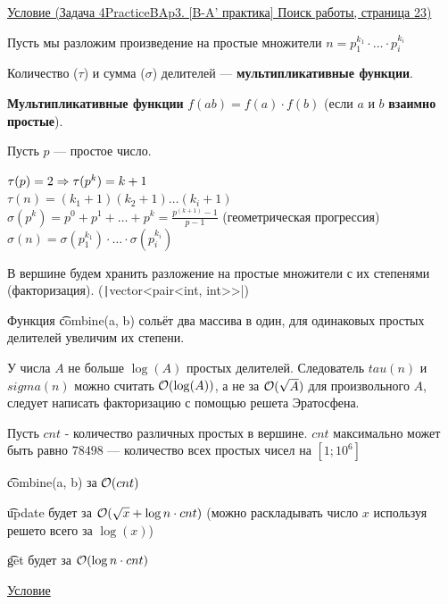 

\href{https://algocode.ru/files/course_summer2020/Tinkoff_Generation_summer_2020_qual.pdf}{Условие (Задача 4PracticeBAp3. [B-A’ практика] Поиск работы, страница 23)}

Пусть мы разложим произведение на простые множители $n = p_1^{k_1} \cdot \ldots \cdot p_i^{k_i}$

Количество ($\tau$) и сумма ($\sigma$) делителей --- {\bf мультипликативные функции}.

{\bf Мультипликативные функции} $f(ab) = f(a) \cdot f(b)$ (если $a$ и $b$ {\bf взаимно простые}). 

Пусть $p$ --- простое число.

$\tau(p) = 2 \Rightarrow \tau(p^k) = k + 1$ \\
$\tau(n) = (k_1+1) (k_2+1) \ldots (k_i+1)$ \\
$\sigma(p ^ k) = p^0 + p^1 + \ldots + p^k = \frac{p^(k + 1) - 1}{p - 1}$ (геометрическая прогрессия) \\
$\sigma(n) = \sigma(p_1^{k_1}) \cdot \ldots \cdot \sigma(p_i^{k_i})$

\down

В вершине будем хранить разложение на простые множители с их степенями (факторизация). (\texttt|vector<pair<int, int>>|)

Функция \t{combine(a, b)} сольёт два массива в один, для одинаковых простых делителей увеличим их степени.


У числа $A$ не больше $\log(A)$ простых делителей. Следователь $tau(n)$ и $sigma(n)$ можно считать $\mathcal{O}(\log(A))$, а не за $\mathcal{O}(\sqrt A)$ для произвольного $A$, следует написать факторизацию с помощью решета Эратосфена.

Пусть $cnt$ - количество различных простых в вершине. $cnt$ максимально может быть равно $78498$ --- количество всех простых чисел на $[1; 10^6]$

\t{combine(a, b)} за $\mathcal{O}(cnt)$

\t{update} будет за $\mathcal{O}(\sqrt x + \log n \cdot cnt)$ (можно раскладывать число $x$ используя решето всего за $\log(x)$)

\t{get} будет за $\mathcal{O}(\log n \cdot cnt)$


\href{https://codeforces.com/contest/339/problem/D}{Условие} \href{https://codeforces.com/contest/339/submission/105829607}{}

